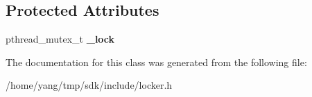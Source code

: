 \subsection*{Protected Attributes}
\begin{DoxyCompactItemize}
\item 
pthread\+\_\+mutex\+\_\+t {\bfseries \+\_\+lock}\hypertarget{class_locker_ac54c95aad09ef586cf91999f662f5b09}{}\label{class_locker_ac54c95aad09ef586cf91999f662f5b09}

\end{DoxyCompactItemize}


The documentation for this class was generated from the following file\+:\begin{DoxyCompactItemize}
\item 
/home/yang/tmp/sdk/include/locker.\+h\end{DoxyCompactItemize}
